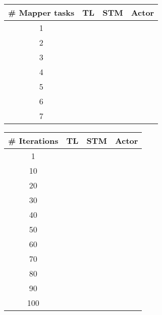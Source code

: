 \begin{center}
\begin{table}[h]
\centering
\begin{tabular}{c|ccc}
\# Mapper tasks 	& \ac{TL}   & \ac{STM}   & Actor \\ \hline
1                   &           &            &       \\
2                   &           &            &       \\
3                   &           &            &       \\
4                   &           &            &       \\
5                   &           &            &       \\
6                   &           &            &       \\
7                   &           &            &      
\end{tabular}
\end{table}
\label{table:test_results_concurrent_tasks}
\end{center}

\begin{center}
\begin{table}[h]
\centering
\begin{tabular}{c|ccc}
\# Iterations 	& \ac{TL}   & \ac{STM}   & Actor \\ \hline
1     			&           &            &       \\
10	     		&           &            &       \\
20	     		&           &            &       \\
30	    		&           &            &       \\
40	    		&           &            &       \\
50	    		&           &            &       \\
60	    		&           &            &       \\
70	    		&           &            &       \\
80	    		&           &            &       \\
90	    		&           &            &       \\
100	    		&           &            &      
\end{tabular}
\end{table}
\label{table:test_results_iterations}
\end{center}

\worksheetend